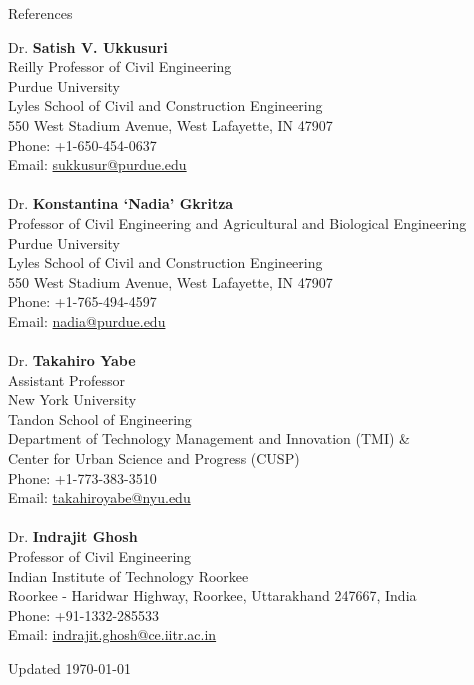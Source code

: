 \documentclass{CV} %
\begin{document}
\begin{rSection}{References}
    \begin{tabbing}
    Dr. \textbf{Satish V. Ukkusuri} \\
    Reilly Professor of Civil Engineering \\
    Purdue University \\ 
    Lyles School of Civil and Construction Engineering \\
    550 West Stadium Avenue, West Lafayette, IN 47907 \\
    Phone: +1-650-454-0637 \\
    Email: \href{mailto:sukkusur@purdue.edu}{sukkusur@purdue.edu} \\
    
    \\ Dr. \textbf{Konstantina `Nadia' Gkritza} \\
    Professor of Civil Engineering and Agricultural and Biological Engineering \\
    Purdue University \\ 
    Lyles School of Civil and Construction Engineering \\
    550 West Stadium Avenue, West Lafayette, IN 47907 \\
    Phone: +1-765-494-4597 \\
    Email: \href{mailto:nadia@purdue.edu}{nadia@purdue.edu} \\

    \\ Dr. \textbf{Takahiro Yabe} \\
    Assistant Professor \\
    New York University \\
    Tandon School of Engineering \\
    Department of Technology Management and Innovation (TMI) \& \\
    Center for Urban Science and Progress (CUSP) \\
    Phone: +1-773-383-3510 \\
    Email: \href{mailto:takahiroyabe@nyu.edu}{takahiroyabe@nyu.edu} \\

    \\ Dr. \textbf{Indrajit Ghosh} \\
    Professor of Civil Engineering \\
    Indian Institute of Technology Roorkee \\ 
    Roorkee - Haridwar Highway, Roorkee, Uttarakhand 247667, India \\
    Phone: +91-1332-285533 \\
    Email: \href{mailto:indrajit.ghosh@ce.iitr.ac.in}{indrajit.ghosh@ce.iitr.ac.in} \\
    \end{tabbing}
\end{rSection}

\vspace*{\fill}
\centering Updated \today
\end{document}
